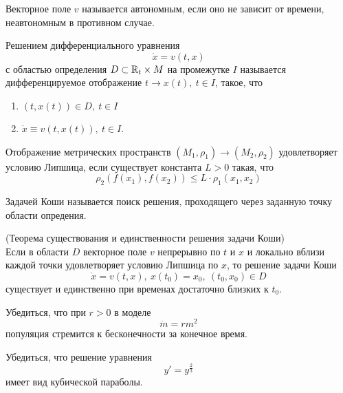 \begin{definition}
    Векторное поле $v$ называется автономным, если оно не зависит от времени, неавтономным в противном случае.
\end{definition} 
\begin{definition}
    Решением дифференциального уравнения
    \[\dot{x}=v(t,x)\]
    с областью определения $D\subset \mathbb{R}_t\times M$ на промежутке $I$ называется дифференцируемое отображение $t \to x(t),\ t\in I$, такое, что
    \begin{enumerate}
        \item $(t,x(t))\in D,\ t\in I$
        \item $\dot{x}\equiv v(t, x(t)),\ t\in I$.
    \end{enumerate}
\end{definition} 
\begin{definition}
    Отображение метрических пространств $(M_1,\rho_1) \to (M_2, \rho_2)$ удовлетворяет условию Липшица, если существует константа $L>0$ такая, что
    \[\rho_2(f(x_1),f(x_2))\leq L\cdot\rho_1(x_1,x_2)\]
\end{definition} 
\begin{definition}
    Задачей Коши называется поиск решения, проходящего через заданную точку области опредения.
\end{definition} 
\begin{theorem} (Теорема существования и единственности решения задачи Коши)\\
    Если в области $D$ векторное поле $v$ непрерывно по $t$ и $x$ и локально вблизи каждой точки удовлетворяет условию Липшица по $x$, то решение задачи Коши 
    \[\dot{x}=v(t,x),\ x(t_0)=x_0,\ (t_0, x_0)\in D\]
    существует и единственно при временах достаточно близких к $t_0$. %
\end{theorem} 
\begin{exercise} Убедиться, что при $r>0$ в моделе
    \[\dot{m}=rm^2\]
    популяция стремится к бесконечности за конечное время.
\end{exercise}
\begin{exercise} Убедиться, что решение уравнения
    \[y'=y^{\frac{2}{3}}\]
    имеет вид кубической параболы.
\end{exercise}